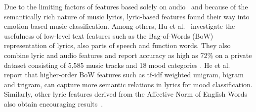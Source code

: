 \documentclass{llncs}
\begin{document}
Due to the limiting factors of features based solely on audio~\cite{DBLP:journals/taslp/LuLZ06} and because of the semantically rich nature of music lyrics, lyric-based features found their way into emotion-based music classification. Among others, Hu et al.~\cite{DBLP:conf/ismir/HuDE09} investigate the usefulness of low-level text features such as the Bag-of-Words (BoW) representation of lyrics, also parts of speech and function words. They also combine lyric and audio features and report accuracy as high as 72\% on a private dataset consisting of 5,585 music tracks and 18 mood categories \cite{DBLP:conf/ismir/HuDLBE08}. He et al.~\cite{DBLP:conf/isica/HeJXCSZ08} report that higher-order BoW features such as tf-idf weighted unigram, bigram and trigram, can capture more semantic relations in lyrics for mood classification. Similarly, other lyric features derived from the Affective Norm of English Words also obtain encouraging results~\cite{DBLP:conf/ismir/HuCY09}. 



\end{document}
